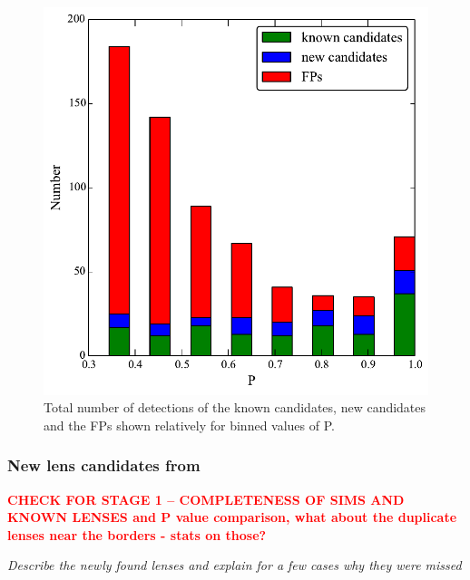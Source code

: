 \documentclass[useAMS,usenatbib,a4paper]{mn2e}
\begin{document}
\begin{figure}
\begin{center}
\includegraphics[scale=0.6]{sw-cfhtls-figs/cand_fp_P.pdf}
\caption{ \label{fig:stackP} Total number of detections of the known
candidates, new candidates and the FPs shown relatively for binned
values of P.
}
\end{center}
\end{figure}



\subsubsection{New lens candidates from \sw}
\label{sec:results:disc}

{\bf \textcolor{red} {
CHECK FOR STAGE 1 -- COMPLETENESS OF SIMS AND KNOWN LENSES
and P value comparison, what about the duplicate lenses near the borders
- stats on those?}}

{\it Describe the newly found lenses and explain for a few
cases why they were missed }
\end{document}
